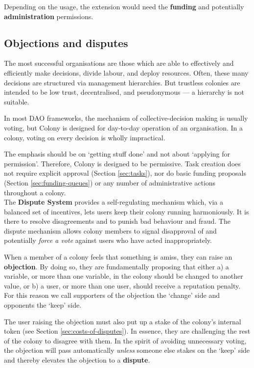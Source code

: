 Depending on the usage, the extension would need the \textbf{funding} and potentially \textbf{administration} permissions.

\subsection{Objections and disputes}\label{sec:objections-and-disputes}

The most successful organisations are those which are able to effectively and efficiently make decisions, divide labour, and deploy resources. Often, these many decisions are structured via management hierarchies. But trustless colonies are intended to be low trust, decentralised, and pseudonymous --- a hierarchy is not suitable.

In most DAO frameworks, the mechanism of collective-decision making is usually voting, but Colony is designed for day-to-day operation of an organisation. In a colony, voting on every decision is wholly impractical.

The emphasis should be on `getting stuff done' and not about `applying for permission'. Therefore, Colony is designed to be permissive. Task creation does not require explicit approval (Section \ref{sec:tasks}), nor do basic funding proposals (Section \ref{sec:funding-queues}) or any number of administrative actions throughout a colony. \\

The \textbf{Dispute System} provides a self-regulating mechanism which, via a balanced set of incentives, lets users keep their colony running harmoniously. It is there to resolve disagreements and to punish bad behaviour and fraud. The dispute mechanism allows colony members to signal disapproval of and potentially \textit{force a vote} against users who have acted inappropriately.

When a member of a colony feels that something is amiss, they can raise an \textbf{objection}. By doing so, they are fundamentally proposing that either a) a variable, or more than one variable, in the colony should be changed to another value, or b) a user, or more than one user, should receive a reputation penalty. For this reason we call supporters of the objection the `change' side and opponents the `keep' side.

The user raising the objection must also put up a stake of the colony's internal token (see Section \ref{sec:costs-of-disputes}). In essence, they are challenging the rest of the colony to disagree with them. In the spirit of avoiding unnecessary voting, the objection will pass automatically \emph{unless} someone else stakes on the `keep' side and thereby elevates the objection to a \textbf{dispute}.

